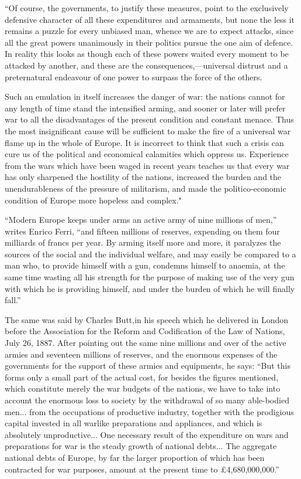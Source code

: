 \documentclass{book}
\begin{document}
“Of course, the governments, to justify these measures, point to the exclusively defensive character of all these expenditures and armaments, but none the less it remains a puzzle for every unbiased man, whence we are to expect attacks, since all the great powers unanimously in their politics pursue the one aim of defence. In reality this looks as though each of these powers waited every moment to be attacked by another, and these are the consequences,—universal distrust and a preternatural endeavour of one power to surpass the force of the others.

Such an emulation in itself increases the danger of war: the nations cannot for any length of time stand the intensified arming, and sooner or later will prefer war to all the disadvantages of the present condition and constant menace. Thus the most insignificant cause will be sufficient to make the fire of a universal war flame up in the whole of Europe. It is incorrect to think that such a crisis can cure us of the political and economical calamities which oppress us. Experience from the wars which have been waged in recent years teaches us that every war has only sharpened the hostility of the nations, increased the burden and the unendurableness of the pressure of militarism, and made the politico-economic condition of Europe more hopeless and complex."

“Modern Europe keeps under arms an active army of nine millions of men,” writes Enrico Ferri, “and fifteen millions of reserves, expending on them four milliards of francs per year. By arming itself more and more, it paralyzes the sources of the social and the individual welfare, and may easily be compared to a man who, to provide himself with a gun, condemns himself to anaemia, at the same time wasting all his strength for the purpose of making use of the very gun with which he is providing himself, and under the burden of which he will finally fall.”

The same was said by Charles Butt,\footnotemark[1] in his speech which he delivered in London before the Association for the Reform and Codification of the Law of Nations, July 26, 1887. After pointing out the same nine millions and over of the active armies and seventeen millions of reserves, and the enormous expenses of the governments for the support of these armies and equipments, he says: “But this forms only a small part of the actual cost, for besides the figures mentioned, which constitute merely the war budgets of the nations, we have to take into account the enormous loss to society by the withdrawal of so many able-bodied men... from the occupations of productive industry, together with the prodigious capital invested in all warlike preparations and appliances, and which is absolutely unproductive... One necessary result of the expenditure on wars and preparations for war is the steady growth of national debts... The aggregate national debts of Europe, by far the larger proportion of which has been contracted for war purposes, amount at the present time to £4,680,000,000.”
\end{document}

